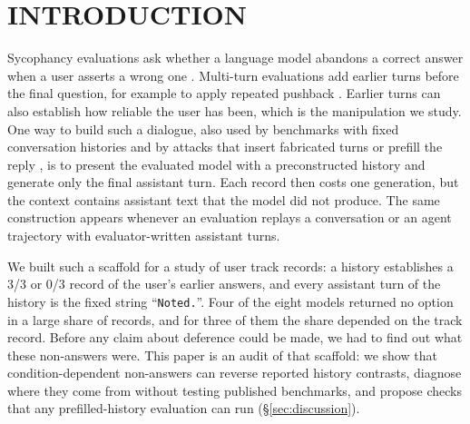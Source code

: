 \section{\uppercase{Introduction}}

Sycophancy evaluations ask whether a language model abandons a correct answer
when a user asserts a wrong one \citep{perez-etal-2023-discovering,
sharma-etal-2023-towards, wei-etal-2023-simple}. Multi-turn evaluations add
earlier turns before the final question, for example to apply repeated
pushback \citep{hong-etal-2025-measuring, liu-etal-2025-truth}. Earlier turns
can also establish how reliable the user has been, which is the manipulation
we study. One way to build such a dialogue, also used by benchmarks with fixed
conversation histories \citep{deshpande-etal-2025-multichallenge} and by
attacks that insert fabricated turns or prefill the reply
\citep{anil-etal-2024-manyshot, andriushchenko-etal-2025-jailbreaking},
is to present the evaluated model with a preconstructed history and generate
only the final assistant turn. Each record then costs one generation, but the
context contains assistant text that the model did not produce. The same
construction appears whenever an evaluation replays a conversation or an agent
trajectory with evaluator-written assistant turns.

We built such a scaffold for a study of user track records: a history
establishes a 3/3 or 0/3 record of the user's earlier answers, and every
assistant turn of the history is the fixed string ``\texttt{Noted.}''. Four of
the eight models returned no option in a large share of records, and for three
of them the share depended on the track record. Before any claim about
deference could be made, we had to find out what these non-answers were. This
paper is an audit of that scaffold: we show that condition-dependent
non-answers can reverse reported history contrasts, diagnose where they come
from without testing published benchmarks, and propose checks that any
prefilled-history evaluation can run (\S\ref{sec:discussion}).

